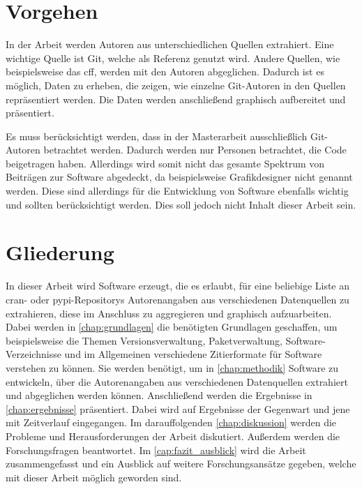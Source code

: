 \section{Vorgehen}
\label{sec:vorgehen}
In der Arbeit werden Autoren aus unterschiedlichen Quellen extrahiert.
Eine wichtige Quelle ist Git, welche als Referenz genutzt wird.
Andere Quellen, wie beispielsweise das \gls{cff}, werden mit den Autoren abgeglichen.
Dadurch ist es möglich, Daten zu erheben, die zeigen, wie einzelne Git-Autoren in den Quellen repräsentiert werden.
Die Daten werden anschließend graphisch aufbereitet und präsentiert.

Es muss berücksichtigt werden, dass in der Masterarbeit ausschließlich Git-Autoren betrachtet werden.
Dadurch werden nur Personen betrachtet, die Code beigetragen haben.
Allerdings wird somit nicht das gesamte Spektrum von Beiträgen zur Software abgedeckt, da beispielsweise Grafikdesigner nicht genannt werden.
Diese sind allerdings für die Entwicklung von Software ebenfalls wichtig und sollten berücksichtigt werden.
Dies soll jedoch nicht Inhalt dieser Arbeit sein.

\section{Gliederung}
\label{sec:gliederung}
In dieser Arbeit wird Software erzeugt, die es erlaubt, für eine beliebige Liste an \gls{cran}- oder \gls{pypi}-Repositorys Autorenangaben aus verschiedenen Datenquellen zu extrahieren, diese im Anschluss zu aggregieren und graphisch aufzuarbeiten.
Dabei werden in \autoref{chap:grundlagen} die benötigten Grundlagen geschaffen, um beispielsweise die Themen Versionsverwaltung, Paketverwaltung, Software-Verzeichnisse und im Allgemeinen verschiedene Zitierformate für Software verstehen zu können.
Sie werden benötigt, um in \autoref{chap:methodik} Software zu entwickeln, über die Autorenangaben aus verschiedenen Datenquellen extrahiert und abgeglichen werden können.
Anschließend werden die Ergebnisse in \autoref{chap:ergebnisse} präsentiert.
Dabei wird auf Ergebnisse der Gegenwart und jene mit Zeitverlauf eingegangen.
Im darauffolgenden \autoref{chap:diskussion} werden die Probleme und Herausforderungen der Arbeit diskutiert.
Außerdem werden die Forschungsfragen beantwortet.
Im \autoref{cap:fazit_ausblick} wird die Arbeit zusammengefasst und ein Ausblick auf weitere Forschungsansätze gegeben, welche mit dieser Arbeit möglich geworden sind.
